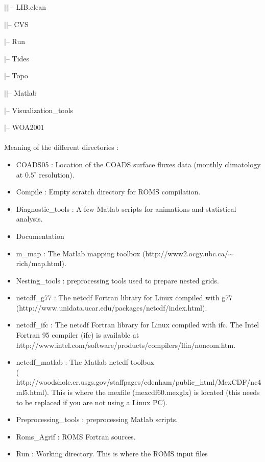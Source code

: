 $|$\hspace{0.5cm}$|$\hspace{0.5cm}$|$-- LIB.clean

$|$\hspace{0.5cm}$|$-- CVS

$|$-- Run

$|$-- Tides

$|$-- Topo

$|$\hspace{0.5cm}$|$-- Matlab

$|$-- Visualization\_tools

$|$-- WOA2001
\\
\\
Meaning of the different directories :
\begin{itemize}
\item COADS05 : Location of the COADS surface fluxes data
(monthly climatology at $0.5^\circ$ resolution).
\item Compile : Empty scratch directory for ROMS compilation.
\item Diagnostic\_tools : A few Matlab scripts for animations and
statistical analysis.
\item Documentation
\item m\_map : The Matlab mapping toolbox 
(http://www2.ocgy.ubc.ca/$\sim$rich/map.html).
\item Nesting\_tools : preprocessing tools used to prepare nested
grids.
\item netcdf\_g77 : The netcdf Fortran library for Linux compiled with g77\\
(http://www.unidata.ucar.edu/packages/netcdf/index.html).
\item netcdf\_ifc : The netcdf Fortran library for Linux compiled with ifc. The
Intel Fortran 95 compiler (ifc) is available at \\
http://www.intel.com/software/products/compilers/flin/noncom.htm.
\item netcdf\_matlab : The Matlab netcdf toolbox  \\
({\small
http://woodshole.er.usgs.gov/staffpages/cdenham/public\_html/MexCDF/nc4ml5.html}).
This is where the mexfile (mexcdf60.mexglx) is located (this needs 
to be replaced if you are not using a Linux PC).
\item Preprocessing\_tools : preprocessing Matlab scripts.
\item Roms\_Agrif : ROMS Fortran sources.
\item Run : Working directory. This is where the ROMS input files

\end{itemize}
